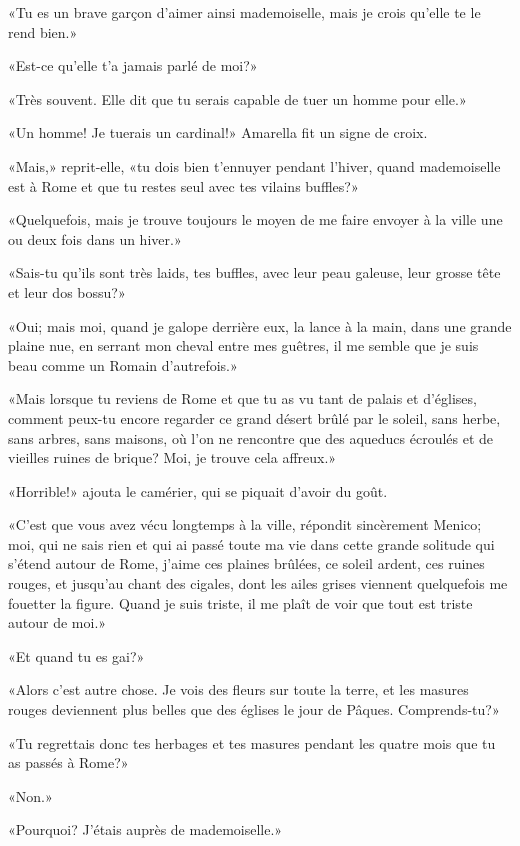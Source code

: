 «Tu es un brave garçon d'aimer ainsi mademoiselle, mais je crois qu'elle
te le rend bien.»

«Est-ce qu'elle t'a jamais parlé de moi?»

«Très souvent. Elle dit que tu serais capable de tuer un homme pour
elle.»

«Un homme! Je tuerais un cardinal!» Amarella fit un signe de croix.

«Mais,» reprit-elle, «tu dois bien t'ennuyer pendant l'hiver, quand
mademoiselle est à Rome et que tu restes seul avec tes vilains buffles?»

«Quelquefois, mais je trouve toujours le moyen de me faire envoyer à la
ville une ou deux fois dans un hiver.»

«Sais-tu qu'ils sont très laids, tes buffles, avec leur peau galeuse,
leur grosse tête et leur dos bossu?»

«Oui; mais moi, quand je galope derrière eux, la lance à la main, dans
une grande plaine nue, en serrant mon cheval entre mes guêtres, il me
semble que je suis beau comme un Romain d'autrefois.»

«Mais lorsque tu reviens de Rome et que tu as vu tant de palais et
d'églises, comment peux-tu encore regarder ce grand désert brûlé par le
soleil, sans herbe, sans arbres, sans maisons, où l'on ne rencontre que
des aqueducs écroulés et de vieilles ruines de brique? Moi, je trouve
cela affreux.»

«Horrible!» ajouta le camérier, qui se piquait d'avoir du goût.

«C'est que vous avez vécu longtemps à la ville, répondit sincèrement
Menico; moi, qui ne sais rien et qui ai passé toute ma vie dans cette
grande solitude qui s'étend autour de Rome, j'aime ces plaines brûlées,
ce soleil ardent, ces ruines rouges, et jusqu'au chant des cigales, dont
les ailes grises viennent quelquefois me fouetter la figure. Quand je
suis triste, il me plaît de voir que tout est triste autour de moi.»

«Et quand tu es gai?»

«Alors c'est autre chose. Je vois des fleurs sur toute la terre, et les
masures rouges deviennent plus belles que des églises le jour de Pâques.
Comprends-tu?»

«Tu regrettais donc tes herbages et tes masures pendant les quatre mois
que tu as passés à Rome?»

«Non.»

«Pourquoi? J'étais auprès de mademoiselle.»

